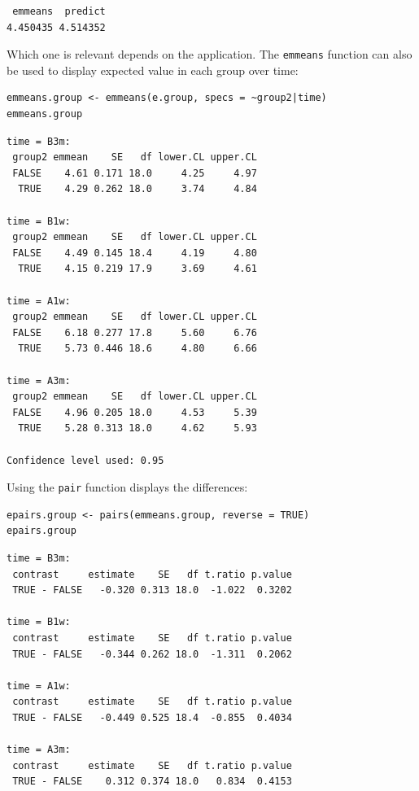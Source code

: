 \documentclass[12pt]{article}
\begin{document}
\begin{verbatim}
 emmeans  predict 
4.450435 4.514352
\end{verbatim}


Which one is relevant depends on the application. The \texttt{emmeans}
function can also be used to display expected value in each group over
time:
\lstset{language=r,label= ,caption= ,captionpos=b,numbers=none}
\begin{lstlisting}
emmeans.group <- emmeans(e.group, specs = ~group2|time)
emmeans.group
\end{lstlisting}

\begin{verbatim}
time = B3m:
 group2 emmean    SE   df lower.CL upper.CL
 FALSE    4.61 0.171 18.0     4.25     4.97
  TRUE    4.29 0.262 18.0     3.74     4.84

time = B1w:
 group2 emmean    SE   df lower.CL upper.CL
 FALSE    4.49 0.145 18.4     4.19     4.80
  TRUE    4.15 0.219 17.9     3.69     4.61

time = A1w:
 group2 emmean    SE   df lower.CL upper.CL
 FALSE    6.18 0.277 17.8     5.60     6.76
  TRUE    5.73 0.446 18.6     4.80     6.66

time = A3m:
 group2 emmean    SE   df lower.CL upper.CL
 FALSE    4.96 0.205 18.0     4.53     5.39
  TRUE    5.28 0.313 18.0     4.62     5.93

Confidence level used: 0.95
\end{verbatim}

\clearpage

Using the \texttt{pair} function displays the differences:
\lstset{language=r,label= ,caption= ,captionpos=b,numbers=none}
\begin{lstlisting}
epairs.group <- pairs(emmeans.group, reverse = TRUE)
epairs.group
\end{lstlisting}

\begin{verbatim}
time = B3m:
 contrast     estimate    SE   df t.ratio p.value
 TRUE - FALSE   -0.320 0.313 18.0  -1.022  0.3202

time = B1w:
 contrast     estimate    SE   df t.ratio p.value
 TRUE - FALSE   -0.344 0.262 18.0  -1.311  0.2062

time = A1w:
 contrast     estimate    SE   df t.ratio p.value
 TRUE - FALSE   -0.449 0.525 18.4  -0.855  0.4034

time = A3m:
 contrast     estimate    SE   df t.ratio p.value
 TRUE - FALSE    0.312 0.374 18.0   0.834  0.4153
\end{verbatim}
\end{document}
